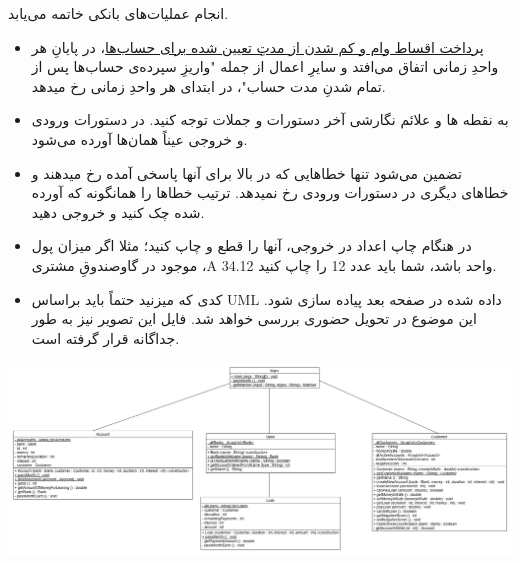 \documentclass[]{article}
\newenvironment{changemargin}[2]{%
\begin{list}{}{%
\setlength{\topsep}{0pt}%
\setlength{\leftmargin}{#1}%
\setlength{\rightmargin}{#2}%
\setlength{\listparindent}{\parindent}%
\setlength{\itemindent}{\parindent}%
\setlength{\parsep}{\parskip}%
}%
\item[]}{\end{list}}
\begin{document}
انجام عملیات‌های بانکی خاتمه می‌یابد.

\hrulefill

\begin{itemize}

\item
	\underline{پرداخت اقساط وام و کم شدن از مدتِ تعیین شده برای حساب‌ها}، در پایانِ هر واحدِ زمانی اتفاق می‌افتد و سایرِ اعمال از جمله "واریزِ سپرده‌ی حساب‌ها پس از تمام شدنِ مدت حساب"، در ابتدای هر واحدِ زمانی رخ میدهد.
	
\item	
	به نقطه ها و علائم نگارشی آخر دستورات و جملات توجه کنید. در دستورات ورودی و خروجی عیناً همان‌ها آورده می‌شود.

\item	
	تضمین می‌شود تنها خطاهایی که در بالا برای آنها پاسخی آمده رخ میدهند و خطاهای دیگری در دستورات ورودی رخ نمیدهد. ترتیب خطاها را همانگونه که آورده شده چک کنید و خروجی دهید.

\item	
	در هنگام چاپ اعداد در خروجی، آنها را قطع و چاپ کنید؛ مثلا اگر میزان پول موجود در گاوصندوقِ مشتری ،A 34.12 واحد باشد، شما باید عدد 12 را چاپ کنید.

\item

{ کدی که میزنید حتماً باید براساس UML داده شده در صفحه بعد پیاده سازی شود. این موضوع در تحویل حضوری بررسی خواهد شد. فایل این تصویر نیز به طور جداگانه قرار گرفته است. }	


	
\end{itemize}
\begin{landscape}
\newpage
\begin{changemargin}{2cm}{-4.5cm}
\thispagestyle{empty}
\begin{center}
\includegraphics[width=1.8\textwidth ]{uml6.png}\\	
\end{center}
\end{changemargin}
\end{landscape}
\newpage
\end{document}

